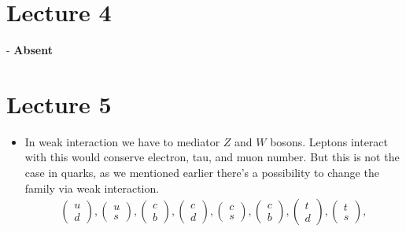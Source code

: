 \documentclass[10pt,a4paper]{article}
\begin{document}
     \section{Lecture 4}
          - \textbf{Absent}
     \section{Lecture 5}
          \begin{itemize}
               \item In weak interaction we have to mediator $Z$ and $W$ bosons. Leptons interact with this would conserve electron, tau, and muon number. But this is not the case in quarks, as we mentioned earlier there's a possibility to change the family via weak interaction.
               \begin{align*}
                    \begin{pmatrix}
                         u \\ d
                    \end{pmatrix} ,
                    \begin{pmatrix}
                         u \\ s
                    \end{pmatrix} ,
                    \begin{pmatrix}
                         c \\ b
                    \end{pmatrix} ,
                    \begin{pmatrix}
                         c \\ d
                    \end{pmatrix} ,
                    \begin{pmatrix}
                         c \\ s
                    \end{pmatrix} ,
                    \begin{pmatrix}
                         c \\ b
                    \end{pmatrix} ,
                    \begin{pmatrix}
                         t \\ d
                    \end{pmatrix} ,
                    \begin{pmatrix}
                         t \\ s
                    \end{pmatrix} ,

\end{align*}
\end{itemize}
\end{document}
